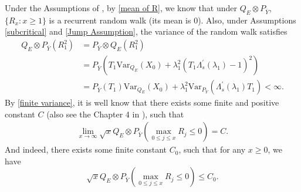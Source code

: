 \documentclass[]{article}
\numberwithin{equation}{section}
\theoremstyle{thmstyleone}%
\theoremstyle{thmstyletwo}%
\theoremstyle{thmstylethree}%
\theoremstyle{thmstylefour}%
\theoremstyle{thmstylefive}%
\theoremstyle{thmstylesix}%
\begin{document}
	Under the Assumptions of , by \cref{mean of R}, we know that under $Q_E\otimes P_{\overline{Y}}$, $\{R_x:x\geqslant 1\}$ is a recurrent random walk (its mean is $0$).
	Also, under Assumptions \ref{subcritical} and \ref{Jump Assumption}, the variance of the random walk satisfies
	\begin{align}
		Q_E\otimes P_{\overline{Y}} \left(R_1^2\right)
		&=
		P_{\overline{Y}}\otimes Q_E\left(R_1^2\right)
		\nonumber\\
		&=
		P_{\overline{Y}} \left(
		T_1 \text{Var}_{Q_E}(X_0)+ \lambda_1^2(T_1\Lambda_s^{\prime}(\lambda_1)-1)^2
		\right)
		\nonumber\\
		&=
		P_{\overline{Y}} (T_1)\text{Var}_{Q_E}(X_0)
		+\lambda_1^2  \text{Var}_{P_{\overline{Y}}} \left( \Lambda_s^{\prime}(\lambda_1)T_1\right)<\infty.
		\label{finite variance}
	\end{align}
	By \cref{finite variance},
	it is well know that there exists some finite and positive constant $C$ (also see the Chapter 4 in \cite{B2}), such that 
	\begin{align}\label{sqrtx probability decay}
		\lim\limits_{x\rightarrow\infty} \sqrt{x}Q_E\otimes P_{\overline{Y}} \left( \max\limits_{0\leqslant j\leqslant x} R_j\leqslant 0 \right) = C.
	\end{align}
	And indeed, there exists some finite constant $C_0$, such that for any $x\geqslant 0$, we have
	\begin{equation}\label{60}
		\sqrt{x}Q_E\otimes P_{\overline{Y}} \left( \max\limits_{0\leqslant j\leqslant x} R_j\leqslant 0 \right) \leqslant C_0.
	\end{equation}
	
\end{document}
